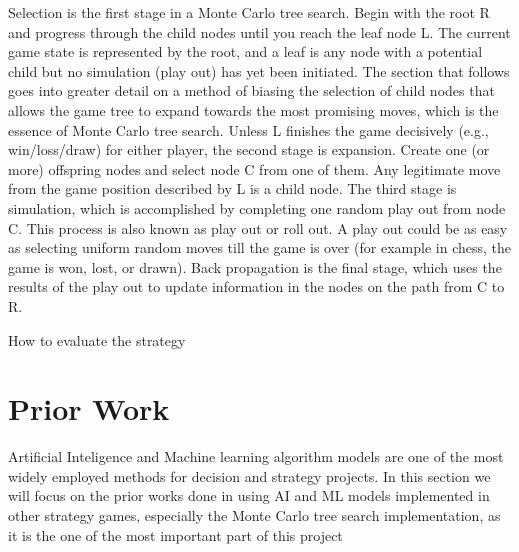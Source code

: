 \documentclass[10pt,twocolumn]{article}
\begin{document}
	Selection is the first stage in a Monte Carlo tree search. Begin with the root R and progress through the child nodes until you reach the leaf node L. The current game state is represented by the root, and a leaf is any node with a potential child but no simulation (play out) has yet been initiated. The section that follows goes into greater detail on a method of biasing the selection of child nodes that allows the game tree to expand towards the most promising moves, which is the essence of Monte Carlo tree search. Unless L finishes the game decisively (e.g., win/loss/draw) for either player, the second stage is expansion. Create one (or more) offspring nodes and select node C from one of them. Any legitimate move from the game position described by L is a child node. The third stage is simulation, which is accomplished by completing one random play out from node C. This process is also known as play out or roll out. A play out could be as easy as selecting uniform random moves till the game is over (for example in chess, the game is won, lost, or drawn). Back propagation is the final stage, which uses the results of the play out to update information in the nodes on the path from C to R.
	
	How to evaluate the strategy
	
\section{Prior Work}
    Artificial Inteligence and Machine learning algorithm models are one of the most widely employed methods for decision and strategy projects. In this section we will focus on the prior works done in using AI and ML models implemented in other strategy games, especially the Monte Carlo tree search implementation, as it is the one of the most important part of this project 
\end{document}
